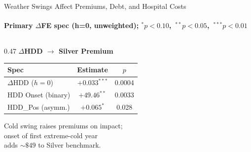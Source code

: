 \documentclass[aspectratio=169,11pt]{beamer}
\newcommand{\emphcolor}[1]{{\color{WarmOrange}\textbf{#1}}}
\newcommand{\tealtext}[1]{{\color{Teal}#1}}
\newcommand{\graytext}[1]{{\color{WarmGray}#1}}
\begin{document}
\begin{frame}[shrink=5]{Weather Swings Affect Premiums, Debt, and Hospital Costs}
  \framesubtitle{Primary $\Delta$FE spec (h=0, unweighted); $^{*}p{<}0.10$,\ $^{**}p{<}0.05$,\ $^{***}p{<}0.01$}
  \small
  \begin{columns}[T]
    \begin{column}{0.47\textwidth}
      \tealtext{\textbf{$\Delta$HDD $\to$ Silver Premium}}\\[0.2em]
      \scriptsize
      \begin{tabular}{lcc}
        \toprule
        Spec & Estimate & $p$ \\
        \midrule
        $\Delta$HDD ($h{=}0$)   & \emphcolor{$+0.033^{***}$} & 0.0004 \\
        HDD Onset (binary)      & \emphcolor{$+49.46^{**}$}  & 0.0033 \\
        HDD\_Pos (asymm.)       & $+0.065^{*}$ & 0.028 \\
        \bottomrule
      \end{tabular}
      \vspace{0.25em}
      \graytext{\scriptsize Cold swing raises premiums on impact;\\onset of first extreme-cold year\\adds $\sim\$49$ to Silver benchmark.}


\end{column}
\end{columns}
\end{frame}
\end{document}
